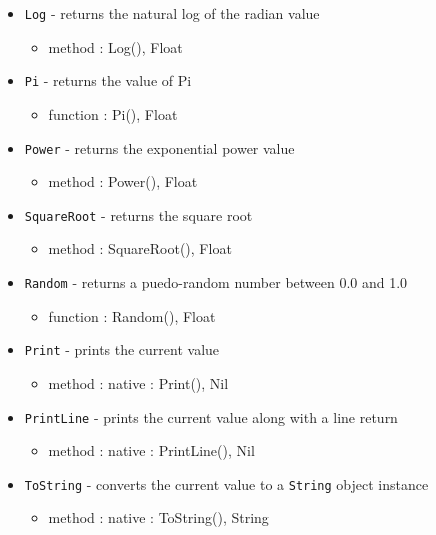 \documentclass[12pt]{article}
\begin{document}
\begin{itemize}
\begin{itemize}
  \end{itemize}	
\item \texttt{Log} - returns the natural log of the radian value
  \begin{itemize}
  \item method : Log(), Float
  \end{itemize}
\item \texttt{Pi} - returns the value of Pi
  \begin{itemize}
  \item function : Pi(), Float
  \end{itemize}
\item \texttt{Power} - returns the exponential power value
  \begin{itemize}
  \item method : Power(), Float
  \end{itemize}
\item \texttt{SquareRoot} - returns the square root
  \begin{itemize}
  \item method : SquareRoot(), Float
  \end{itemize}
\item \texttt{Random} - returns a puedo-random number between 0.0 and 1.0 
  \begin{itemize}
  \item function : Random(), Float
  \end{itemize}
\item \texttt{Print} - prints the current value
  \begin{itemize}
  \item method : native : Print(), Nil
  \end{itemize}
\item \texttt{PrintLine} - prints the current value along with a line return
  \begin{itemize}
  \item method : native : PrintLine(), Nil
  \end{itemize}
\item \texttt{ToString} - converts the current value to a \texttt{String} object instance
  \begin{itemize}
  \item method : native : ToString(), String
  \end{itemize}
\end{itemize}
\end{document}
